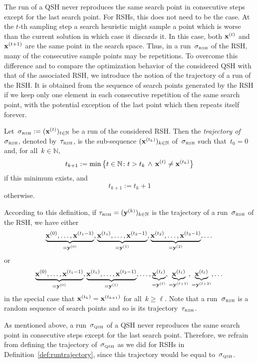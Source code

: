 \documentclass[a4paper,11pt]{article}
\begin{document}
The run of a QSH never reproduces the same search point in consecutive steps except for the last search point. For RSHs, this does not need to be the case. At the $t$-th sampling step a search heuristic might sample a point which is worse than the current solution in which case it discards it. In this case, both $\xvec[t]$ and $\xvec[t+1]$ are the same point in the search space. Thus, in a run~$\sigma_{\text{\tiny\rm RSH}}$ of the RSH, many of the consecutive sample points may be repetitions. To overcome this difference and to compare the optimization behavior of the considered QSH with that of the associated RSH, we introduce the notion of the trajectory of a run of the RSH. It is obtained from the sequence of search points generated by the RSH if we keep only one element in each consecutive repetition of the same search point, with the potential exception of the last point which then repeats itself forever. 
\begin{definition}
\label{def:runtrajectory}
Let~$\sigma_\RSH:=(\xvec[t])_{t\in\mathbb{N}}$ be a run of the considered RSH. Then the \emph{trajectory of} $\sigma_{\text{\tiny\rm RSH}}$, denoted by~$\tau_{\text{\tiny\rm RSH}}$, is the sub-sequence $(\xvec[t_k])_{k\in\mathbb{N}}$ of~$\sigma_{\text{\tiny\rm RSH}}$ such that~$t_0=0$ and, for all~$k\in\mathbb{N}$,
\[
t_{k+1}:=\min\big\{t\in\mathbb{N}\colon t>t_k\,\wedge\,\xvec[t]\neq\xvec[t_k]\big\}
\]
if this minimum exists, and
\[
t_{k+1}:=t_k+1
\]
otherwise.
\end{definition}
According to this definition, if $\tau_\RSH=(\yvec[k])_{k\in\mathbb{N}}$ is the trajectory of a run~$\sigma_{\text{\tiny\rm RSH}}$ of the RSH, we have either
\[
\underbrace{\xvec[0],\dots,\xvec[t_1-1]}_{=\yvec[0]},\underbrace{\xvec[t_1],\dots,\xvec[t_2-1]}_{=\yvec[1]},\underbrace{\xvec[t_2],\dots,\xvec[t_3-1]}_{=\yvec[2]},\dots
\]
or
\[
\underbrace{\xvec[0],\dots,\xvec[t_1-1]}_{=\yvec[0]},\underbrace{\xvec[t_1],\dots,\xvec[t_2-1]}_{=\yvec[1]},\dots,\underbrace{\xvec[t_\ell]}_{=\yvec[\ell]},\underbrace{\xvec[t_\ell]}_{=\yvec[\ell+1]},\underbrace{\xvec[t_\ell]}_{=\yvec[\ell+2]},\dots
\]
in the special case that $\xvec[t_k]=\xvec[t_{k+1}]$ for all~$k\ge\ell$. Note that a run~$\sigma_{\text{\tiny\rm RSH}}$ is a random sequence of search points and so is its trajectory~$\tau_{\text{\tiny\rm RSH}}$.

As mentioned above, a run~$\sigma_{\text{\tiny\rm QSH}}$ of a QSH never reproduces the same search point in consecutive steps except for the last search point. Therefore, we refrain from defining the trajectory of~$\sigma_{\text{\tiny\rm QSH}}$ as we did for RSHs in Definition~\ref{def:runtrajectory}, since this trajectory would be equal to~$\sigma_{\text{\tiny\rm QSH}}$.
\end{document}
